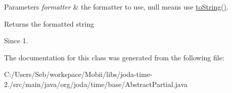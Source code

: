 \begin{DoxyParams}{Parameters}
{\em formatter} & the formatter to use, null means use {\ttfamily \hyperlink{classorg_1_1joda_1_1time_1_1base_1_1_abstract_partial_a81c28665ed42368cc92e5cb986d10e74}{to\-String()}}. \\
\hline
\end{DoxyParams}
\begin{DoxyReturn}{Returns}
the formatted string 
\end{DoxyReturn}
\begin{DoxySince}{Since}
1. 
\end{DoxySince}


The documentation for this class was generated from the following file\-:\begin{DoxyCompactItemize}
\item 
C\-:/\-Users/\-Seb/workspace/\-Mobii/libs/joda-\/time-\/2./src/main/java/org/joda/time/base/Abstract\-Partial.\-java\end{DoxyCompactItemize}
